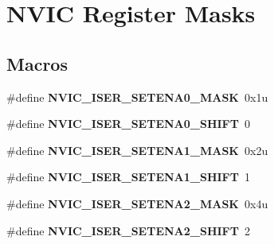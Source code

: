 \hypertarget{group___n_v_i_c___register___masks}{}\section{N\+V\+IC Register Masks}
\label{group___n_v_i_c___register___masks}
\subsection*{Macros}
\begin{DoxyCompactItemize}
\item 
\mbox{\label{group___n_v_i_c___register___masks_gade84d6ce234da2232d63de2a7d920566}} 
\#define {\bfseries N\+V\+I\+C\+\_\+\+I\+S\+E\+R\+\_\+\+S\+E\+T\+E\+N\+A0\+\_\+\+M\+A\+SK}~0x1u
\item 
\mbox{\label{group___n_v_i_c___register___masks_gad891fffc0f454fd2dd8fd484ed835412}} 
\#define {\bfseries N\+V\+I\+C\+\_\+\+I\+S\+E\+R\+\_\+\+S\+E\+T\+E\+N\+A0\+\_\+\+S\+H\+I\+FT}~0
\item 
\mbox{\label{group___n_v_i_c___register___masks_gaa052596053f5deb896778cf07ae07332}} 
\#define {\bfseries N\+V\+I\+C\+\_\+\+I\+S\+E\+R\+\_\+\+S\+E\+T\+E\+N\+A1\+\_\+\+M\+A\+SK}~0x2u
\item 
\mbox{\label{group___n_v_i_c___register___masks_ga9498e7a628361dcfb00f7cea08fb58f4}} 
\#define {\bfseries N\+V\+I\+C\+\_\+\+I\+S\+E\+R\+\_\+\+S\+E\+T\+E\+N\+A1\+\_\+\+S\+H\+I\+FT}~1
\item 
\mbox{\label{group___n_v_i_c___register___masks_ga4336c0d4aaca32a9f97f5c7558ffe88d}} 
\#define {\bfseries N\+V\+I\+C\+\_\+\+I\+S\+E\+R\+\_\+\+S\+E\+T\+E\+N\+A2\+\_\+\+M\+A\+SK}~0x4u
\item 
\mbox{\label{group___n_v_i_c___register___masks_ga7b3a1e9d213bb5650183eda218c0b7c7}} 
\#define {\bfseries N\+V\+I\+C\+\_\+\+I\+S\+E\+R\+\_\+\+S\+E\+T\+E\+N\+A2\+\_\+\+S\+H\+I\+FT}~2
\item 
\mbox{\label{group___n_v_i_c___register___masks_ga3aedf59ff8f12612a8e93548187e6f97}} 

\end{DoxyCompactItemize}
